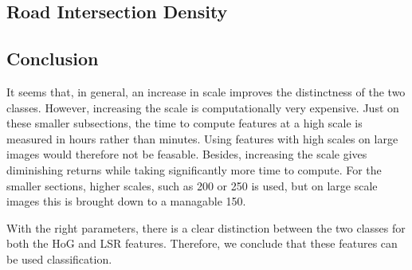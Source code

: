 \subsection{Road Intersection Density}

\subsection{Conclusion}

It seems that, in general, an increase in scale improves the distinctness of
the two classes. However, increasing the scale is computationally very
expensive. Just on these smaller subsections, the time to compute features at
a high scale is measured in hours rather than minutes. Using features with high
scales on large images would therefore not be feasable. Besides, increasing the
scale gives diminishing returns while taking significantly more time to
compute. For the smaller sections, higher scales, such as 200 or 250 is
used, but on large scale images this is brought down to a managable 150.

With the right parameters, there is a clear distinction between the two classes
for both the HoG and LSR features. Therefore, we conclude that these features
can be used classification. 



